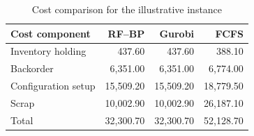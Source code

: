 \begin{table}[htbp]
\centering
\caption{Cost comparison for the illustrative instance}
\begin{tabular}{lrrr}
\toprule
Cost component & RF--BP & Gurobi & FCFS \\
\midrule
Inventory holding & 437.60 & 437.60 & 388.10 \\
Backorder & 6,351.00 & 6,351.00 & 6,774.00 \\
Configuration setup & 15,509.20 & 15,509.20 & 18,779.50 \\
Scrap & 10,002.90 & 10,002.90 & 26,187.10 \\
Total & 32,300.70 & 32,300.70 & 52,128.70 \\
\bottomrule
\end{tabular}
\end{table}